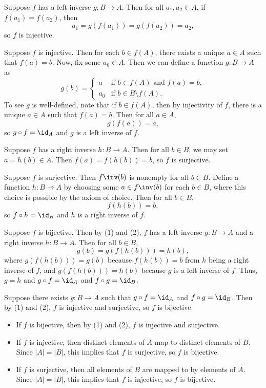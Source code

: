 \begin{proofnum}
    \item \rightimp Suppose $f$ has a left inverse $g : B \to A$.
    Then for all $a_1, a_2 \in A$, if $f(a_1) = f(a_2)$, then
    \[
        a_1 = g(f(a_1)) = g(f(a_2)) = a_2,
    \]
    so $f$ is injective.

    \leftimp Suppose $f$ is injective.
    Then for each $b \in f(A)$, there exists a unique $a \in A$ such that $f(a) = b$.
    Now, fix some $a_0 \in A$. Then we can define a function $g : B \to A$ as
    \[
        g(b) = 
        \begin{cases}
            a & \text{if } b \in f(A) \text{ and } f(a) = b,\\
            a_0 & \text{if } b \in B \setminus f(A).
        \end{cases}
    \]
    To see $g$ is well-defined, note that if $b \in f(A)$, then by injectivity of $f$, there is a unique $a \in A$ such that $f(a) = b$.
    Then for all $a \in A$,
    \[
        g(f(a)) = a,
    \]
    so $g \circ f = \id_A$ and $g$ is a left inverse of $f$.
    \item \rightimp Suppose $f$ has a right inverse $h : B \to A$.
    Then for all $b \in B$, we may set $a = h(b) \in A$.
    Then $f(a) = f(h(b)) = b$, so $f$ is surjective.
    
    \leftimp Suppose $f$ is surjective.
    Then $f\inv(b)$ is nonempty for all $b \in B$.
    Define a function $h : B \to A$ by choosing some $a \in f\inv(b)$ for each $b \in B$, where this choice is possible by the axiom of choice.
    Then for all $b \in B$,
    \[
        f(h(b)) = b,
    \]
    so $f \circ h = \id_B$ and $h$ is a right inverse of $f$.
    \item \rightimp Suppose $f$ is bijective.
    Then by (1) and (2), $f$ has a left inverse $g : B \to A$ and a right inverse $h : B \to A$.
    Then for all $b \in B$,
    \[
        g(b) = g(f(h(b))) = h(b),
    \]
    where $g(f(h(b))) = g(b)$ because $f(h(b)) = b$ from $h$ being a right inverse of $f$, and $g(f(h(b))) = h(b)$ because $g$ is a left inverse of $f$.
    Thus, $g = h$ and $g \circ f = \id_A$ and $f \circ g = \id_B$.

    \leftimp Suppose there exists $g : B \to A$ such that $g \circ f = \id_A$ and $f \circ g = \id_B$.
    Then by (1) and (2), $f$ is injective and surjective, so $f$ is bijective.
    \item
    \begin{itemize}
        \item If $f$ is bijective, then by (1) and (2), $f$ is injective and surjective.
        \item If $f$ is injective, then distinct elements of $A$ map to distinct elements of $B$.
        Since $|A| = |B|$, this implies that $f$ is surjective, so $f$ is bijective.
        \item If $f$ is surjective, then all elements of $B$ are mapped to by elements of $A$.
        Since $|A| = |B|$, this implies that $f$ is injective, so $f$ is bijective. \qedhere
    \end{itemize}
\end{proofnum}

